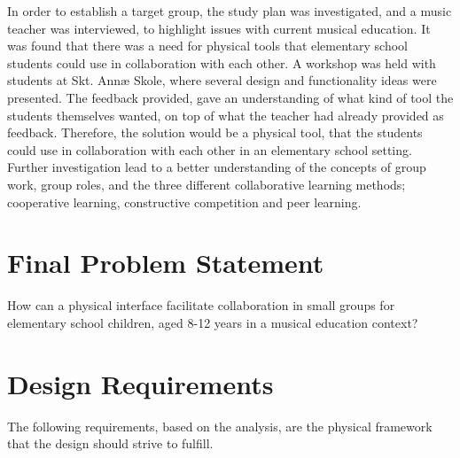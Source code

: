 In order to establish a target group, the study plan was investigated, and a music teacher was interviewed, to highlight issues with current musical education. It was found that there was a need for physical tools that elementary school students could use in collaboration with each other. A workshop was held with students at Skt. Annæ Skole, where several design and functionality ideas were presented. The feedback provided, gave an understanding of what kind of tool the students themselves wanted, on top of what the teacher had already provided as feedback. Therefore, the solution would be a physical tool, that the students could use in collaboration with each other in an elementary school setting.\\

Further investigation lead to a better understanding of the concepts of group work, group roles, and the three different collaborative learning methods; cooperative learning, constructive competition and peer learning.\\


\section{Final Problem Statement}\label{sec:FPS}
	How can a physical interface facilitate collaboration in small groups for elementary school children, aged 8-12 years in a musical education context?

	
\section{Design Requirements}\label{sec:DRequirements}

The following requirements, based on the analysis, are the physical framework that the design should strive to fulfill.
